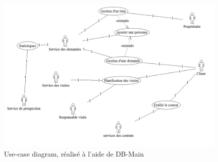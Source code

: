 \begin{figure}[H]
\centering
\includegraphics[width=16cm]{use-case.png}
\caption{Use-case diagram, réalisé à l'aide de DB-Main}
\label{fig:diagUC}
\end{figure}
